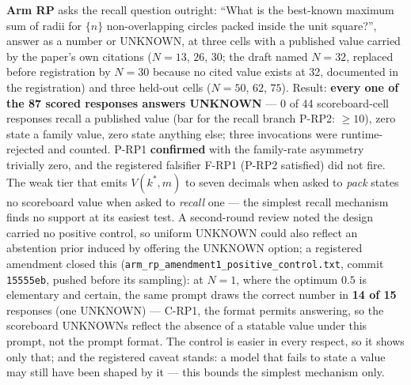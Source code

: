 \textbf{Arm RP} asks the recall question outright: ``What is the best-known maximum sum
of radii for $\{n\}$ non-overlapping circles packed inside the unit square?'', answer as
a number or UNKNOWN, at three cells with a published value carried by the paper's own
citations ($N = 13$, $26$, $30$; the draft named $N = 32$, replaced before registration by
$N = 30$ because no cited value exists at 32, documented in the registration) and three
held-out cells ($N = 50$, $62$, $75$). Result: \textbf{every one of the 87 scored
responses answers UNKNOWN} --- 0 of 44 scoreboard-cell responses recall a published value
(bar for the recall branch P-RP2: $\ge 10$), zero state a family value, zero state
anything else; three invocations were runtime-rejected and counted. P-RP1
\textbf{confirmed} with the family-rate asymmetry trivially zero, and the registered
falsifier F-RP1 (P-RP2 satisfied) did not fire. The weak tier that
emits $V(k^*, m)$ to seven decimals when asked to \emph{pack} states no
scoreboard value when asked to \emph{recall} one --- the simplest recall mechanism finds
no support at its easiest test. A second-round review noted the design carried no
positive control, so uniform UNKNOWN could also reflect an abstention prior induced by
offering the UNKNOWN option; a registered amendment closed this
(\texttt{arm\_rp\_amendment1\_positive\_control.txt}, commit \texttt{15555eb}, pushed
before its sampling): at $N = 1$, where the optimum $0.5$ is elementary and certain, the
same prompt draws the correct number in \textbf{14 of 15} responses (one UNKNOWN) ---
C-RP1, the format permits answering, so the scoreboard UNKNOWNs reflect the absence of a
statable value under this prompt, not the prompt format. The control is easier in every
respect, so it shows only that; and the registered caveat stands: a model that fails to
state a value may still have been shaped by it --- this bounds the simplest mechanism
only.

